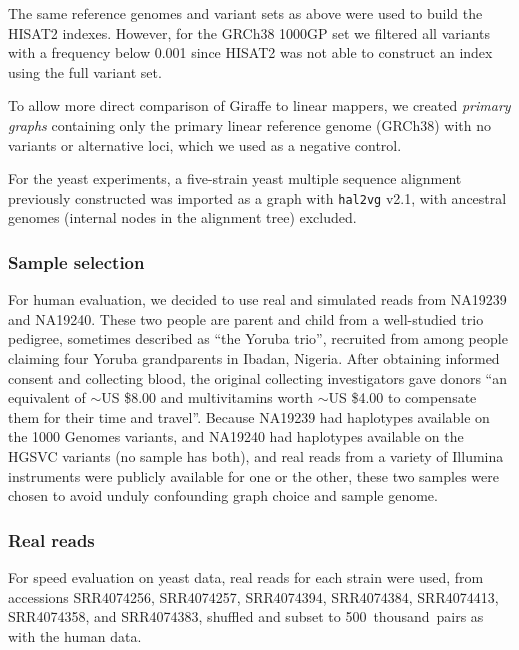 \documentclass[11pt]{ucscthesis}
\newcommand{\vocab}[1]{\emph{#1}}
\begin{document}
The same reference genomes and variant sets as above were used to build the HISAT2 indexes.
However, for the GRCh38 1000GP set we filtered all variants with a frequency below 0.001 since HISAT2 was not able to construct an index using the full variant set.

To allow more direct comparison of Giraffe to linear mappers, we created \vocab{primary graphs} containing only the primary linear reference genome (GRCh38) with no variants or alternative loci, which we used as a negative control.

For the yeast experiments, a five-strain yeast multiple sequence alignment previously constructed\cite{hickey_vgsv_2020} was imported as a graph with \texttt{hal2vg} v2.1\cite{hickey_vgsv_2020}, with ancestral genomes (internal nodes in the alignment tree) excluded.


\subsubsection{Sample selection}

For human evaluation, we decided to use real and simulated reads from NA19239 and NA19240. These two people are parent and child from a well-studied trio pedigree, sometimes described as ``the Yoruba trio'', recruited from among people claiming four Yoruba grandparents in Ibadan, Nigeria\cite{international2005haplotype,abyzov2011cnvnator}.
After obtaining informed consent and collecting blood, the original collecting investigators gave donors ``an equivalent of $\sim$US \$8.00 and multivitamins worth $\sim$US \$4.00 to compensate them for their time and travel''\cite{international2004integrating}.
Because NA19239 had haplotypes available on the 1000 Genomes variants, and NA19240 had haplotypes available on the HGSVC variants (no sample has both), and real reads from a variety of Illumina instruments were publicly available for one or the other, these two samples were chosen to avoid unduly confounding graph choice and sample genome.


\subsubsection{Real reads}

For speed evaluation on yeast data, real reads for each strain were used, from accessions SRR4074256, SRR4074257, SRR4074394, SRR4074384, SRR4074413, SRR4074358, and SRR4074383, shuffled and subset to 500~thousand~pairs as with the human data.
\end{document}
